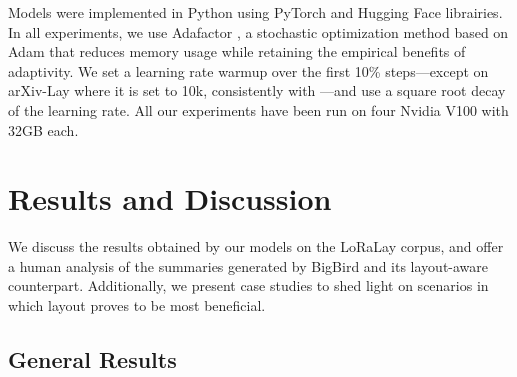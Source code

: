 Models were implemented in Python using PyTorch \citep{paszke2017automatic} and Hugging Face \citep{wolf2019huggingface} librairies. In all experiments, we use Adafactor \citep{shazeer2018adafactor}, a stochastic optimization method based on Adam \citep{kingma2014adam} that reduces memory usage while retaining the empirical benefits of adaptivity. We set a learning rate warmup over the first 10\% steps—except on arXiv-Lay where it is set to 10k, consistently with \citet{zaheer2020big}—and use a square root decay of the learning rate. All our experiments have been run on four Nvidia V100 with 32GB each. 

\section{Results and Discussion}

We discuss the results obtained by our models on the LoRaLay corpus, and offer a human analysis of the summaries generated by BigBird and its layout-aware counterpart. Additionally, we present case studies to shed light on scenarios in which layout proves to be most beneficial.

\subsection{General Results}

                            
